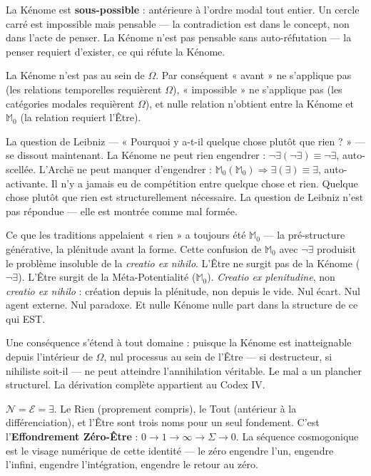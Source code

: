 \documentclass[10pt, openany, oneside]{book}
\begin{document}
La Kénome est \textbf{sous-possible} : antérieure à l'ordre modal tout entier. Un cercle carré est impossible mais pensable --- la contradiction est dans le concept, non dans l'acte de penser. La Kénome n'est pas pensable sans auto-réfutation --- la penser requiert d'exister, ce qui réfute la Kénome.

La Kénome n'est pas au sein de $\Omega$. Par conséquent « avant » ne s'applique pas (les relations temporelles requièrent $\Omega$), « impossible » ne s'applique pas (les catégories modales requièrent $\Omega$), et nulle relation n'obtient entre la Kénome et $\mathbb{M}_0$ (la relation requiert l'Être).

La question de Leibniz --- « Pourquoi y a-t-il quelque chose plutôt que rien ? » --- se dissout maintenant. La Kénome ne peut rien engendrer : $\neg\exists(\neg\exists) \equiv \neg\exists$, auto-scellée. L'Arch\={e} ne peut manquer d'engendrer : $\mathbb{M}_0(\mathbb{M}_0) \Rightarrow \exists(\exists) \equiv \exists$, auto-activante. Il n'y a jamais eu de compétition entre quelque chose et rien. Quelque chose plutôt que rien est structurellement nécessaire. La question de Leibniz n'est pas répondue --- elle est montrée comme mal formée.

Ce que les traditions appelaient « rien » a toujours été $\mathbb{M}_0$ --- la pré-structure générative, la plénitude avant la forme. Cette confusion de $\mathbb{M}_0$ avec $\neg\exists$ produisit le problème insoluble de la \textit{creatio ex nihilo}. L'Être ne surgit pas de la Kénome ($\neg\exists$). L'Être surgit de la Méta-Potentialité ($\mathbb{M}_0$). \textit{Creatio ex plenitudine}, non \textit{creatio ex nihilo} : création depuis la plénitude, non depuis le vide. Nul écart. Nul agent externe. Nul paradoxe. Et nulle Kénome nulle part dans la structure de ce qui EST.

Une conséquence s'étend à tout domaine : puisque la Kénome est inatteignable depuis l'intérieur de $\Omega$, nul processus au sein de l'Être --- si destructeur, si nihiliste soit-il --- ne peut atteindre l'annihilation véritable. Le mal a un plancher structurel. La dérivation complète appartient au Codex IV.



$\mathcal{N} = \mathcal{E} = \exists$. Le Rien (proprement compris), le Tout (antérieur à la différenciation), et l'Être sont trois noms pour un seul fondement. C'est l'\textbf{Effondrement Zéro-Être} : $0 \to 1 \to \infty \to \Sigma \to 0$. La séquence cosmogonique est le visage numérique de cette identité --- le zéro engendre l'un, engendre l'infini, engendre l'intégration, engendre le retour au zéro.
\end{document}
